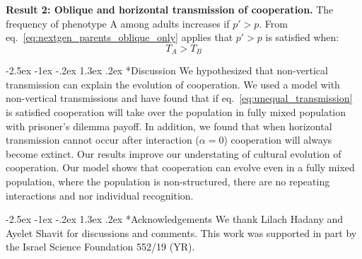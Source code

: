 \documentclass[12pt]{extarticle}
\makeatletter
\renewcommand\section{\@startsection {section}{1}{\z@}%
     {-2.5ex \@plus -1ex \@minus -.2ex}%
     {1.3ex \@plus.2ex}%
    {\Large\bfseries}}
\makeatother
\begin{document}
\textbf{Result 2: Oblique and horizontal transmission of cooperation.} The frequency of phenotype A among adults increases if $p'>p$. From eq.~\ref{eq:nextgen_parents_oblique_only} applies that $p'>p$ is satisfied when:
\begin{equation} \label{eq:oblique_only_result}
T_A>T_B  
\end{equation}

\section*{Discussion}
We hypothesized that non-vertical transmission can explain the evolution of cooperation. We used a model with non-vertical transmissions and have found that if eq.~\ref{eq:unequal_transmission} is satisfied cooperation will take over the population in fully mixed population with prisoner's dilemma payoff. In addition, we found that when horizontal transmission cannot occur after interaction ($\alpha = 0$) cooperation will always become extinct. 
Our results improve our understating of cultural evolution of cooperation. Our model shows that cooperation can evolve even in a fully mixed population, where the population is non-structured, there are no repeating interactions and nor individual recognition.

{\small
\section*{Acknowledgements}
We thank Lilach Hadany and Ayelet Shavit for discussions and comments.
This work was supported in part by
the Israel Science Foundation 552/19 (YR).
}




\newpage
\end{document}
